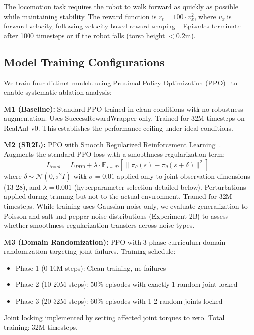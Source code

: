 \documentclass[conference]{IEEEtran}
\begin{document}
The locomotion task requires the robot to walk forward as quickly as possible while maintaining stability. The reward function is $r_t = 100 \cdot v_x^2$, where $v_x$ is forward velocity, following velocity-based reward shaping~\cite{sutton2018reinforcement}. Episodes terminate after 1000 timesteps or if the robot falls (torso height $< 0.2$m).

\subsection{Model Training Configurations}

We train four distinct models using Proximal Policy Optimization (PPO)~\cite{schulman2017proximal} to enable systematic ablation analysis:

\textbf{M1 (Baseline):} Standard PPO trained in clean conditions with no robustness augmentation. Uses SuccessRewardWrapper only. Trained for 32M timesteps on RealAnt-v0. This establishes the performance ceiling under ideal conditions.

\textbf{M2 (SR2L):} PPO with Smooth Regularized Reinforcement Learning~\cite{shen2020deep}. Augments the standard PPO loss with a smoothness regularization term:
\begin{equation}
L_{total} = L_{PPO} + \lambda \cdot \mathbb{E}_{s \sim \mathcal{D}} [\|\pi_\theta(s) - \pi_\theta(s + \delta)\|^2]
\end{equation}
where $\delta \sim \mathcal{N}(0, \sigma^2 I)$ with $\sigma = 0.01$ applied only to joint observation dimensions (13-28), and $\lambda = 0.001$ (hyperparameter selection detailed below). Perturbations applied during training but not to the actual environment. Trained for 32M timesteps. While training uses Gaussian noise only, we evaluate generalization to Poisson and salt-and-pepper noise distributions (Experiment 2B) to assess whether smoothness regularization transfers across noise types.

\textbf{M3 (Domain Randomization):} PPO with 3-phase curriculum domain randomization targeting joint failures. Training schedule:
\begin{itemize}
    \item Phase 1 (0-10M steps): Clean training, no failures
    \item Phase 2 (10-20M steps): 50\% episodes with exactly 1 random joint locked
    \item Phase 3 (20-32M steps): 60\% episodes with 1-2 random joints locked
\end{itemize}
Joint locking implemented by setting affected joint torques to zero. Total training: 32M timesteps.
\end{document}
